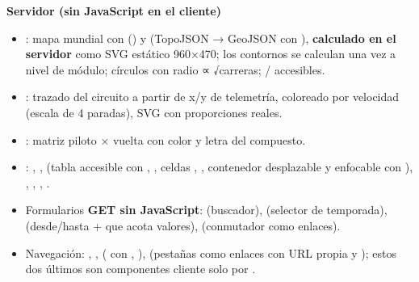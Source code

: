 \textbf{Servidor (sin JavaScript en el cliente)}

\begin{itemize}
\item {}: mapa mundial con  () y  (TopoJSON → GeoJSON con ), \textbf{calculado en el servidor} como SVG estático 960×470; los contornos se calculan una vez a nivel de módulo; círculos con radio ∝ √carreras; / accesibles.
\item {}: trazado del circuito a partir de x/y de telemetría, coloreado por velocidad (escala de 4 paradas), SVG con proporciones reales.
\item {}: matriz piloto × vuelta con color y letra del compuesto.
\item {}: , ,  (tabla accesible con , , celdas , , contenedor  desplazable y enfocable con ), , , , .
\item Formularios \textbf{GET sin JavaScript}:  (buscador),  (selector de temporada),  (desde/hasta +  que acota valores),  (conmutador como enlaces).
\item Navegación: , ,  ( con , ),  (pestañas como enlaces con URL propia y ); estos dos últimos son componentes cliente solo por .
\end{itemize}

